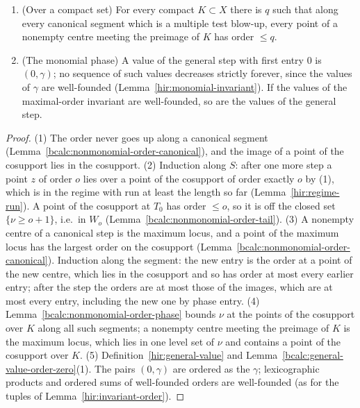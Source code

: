 \begin{lemma}
\begin{enumerate}
\(\operatorname{cosupp}\underline{\mathcal I}_T\). Along a canonical segment which is a multiple test blow-up the orders of the points of the nonempty centres, in the order
of the steps, never increase, and every point of the last cosupport has order at most each of them.
\item (Over a compact set) For every compact \(K\subset X\) there is \(q\) such that along every canonical segment which is a multiple test blow-up, every point of a
nonempty centre meeting the preimage of \(K\) has order \(\le q\).
\item (The monomial phase) A value of the general step with first entry \(0\) is \((0,\gamma)\); no sequence of such values decreases strictly forever, since the values
of \(\gamma\) are well-founded (Lemma~\ref{hir:monomial-invariant}). If the values of the maximal-order invariant are well-founded, so are the values of the general
step.
\end{enumerate}
\end{lemma}
\begin{proof}
\mixedleanok
(1) The order never goes up along a canonical segment (Lemma~\ref{bcalc:nonmonomial-order-canonical}), and the image of a point of the cosupport lies in the cosupport.
(2) Induction along \(S\): after one more step a point \(z\) of order \(o\) lies over a point of the cosupport of order exactly \(o\) by (1), which is in the
regime with run at least the length so far (Lemma~\ref{hir:regime-run}). A point of the cosupport at \(T_0\) has order \(\le o\), so it is off the closed set
\(\{\nu\ge o+1\}\), i.e.\ in \(W_o\) (Lemma~\ref{bcalc:nonmonomial-order-tail}).
(3) A nonempty centre of a canonical step is the maximum locus, and a point of the maximum locus has the largest order on the cosupport
(Lemma~\ref{bcalc:nonmonomial-order-canonical}). Induction along the segment: the new entry is the order at a point of the new centre, which lies in the cosupport and so
has order at most every earlier entry; after the step the orders are at most those of the images, which are at most every entry, including the new one by phase entry.
(4) Lemma~\ref{bcalc:nonmonomial-order-phase} bounds \(\nu\) at the points of the cosupport over \(K\) along all such segments; a nonempty centre meeting the preimage of
\(K\) is the maximum locus, which lies in one level set of \(\nu\) and contains a point of the cosupport over \(K\).
(5) Definition~\ref{hir:general-value} and Lemma~\ref{bcalc:general-value-order-zero}(1). The pairs \((0,\gamma)\) are ordered as the \(\gamma\); lexicographic products and
ordered sums of well-founded orders are well-founded (as for the tuples of Lemma~\ref{hir:invariant-order}).
\end{proof}

